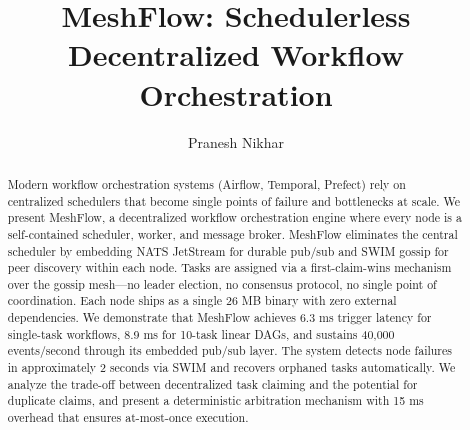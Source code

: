 \documentclass[sigconf]{acmart}
\begin{document}
\title{MeshFlow: Schedulerless Decentralized Workflow Orchestration}

\author{Pranesh Nikhar}

\begin{abstract}
Modern workflow orchestration systems (Airflow, Temporal, Prefect) rely on centralized schedulers that become single points of failure and bottlenecks at scale. We present MeshFlow, a decentralized workflow orchestration engine where every node is a self-contained scheduler, worker, and message broker. MeshFlow eliminates the central scheduler by embedding NATS JetStream for durable pub/sub and SWIM gossip for peer discovery within each node. Tasks are assigned via a first-claim-wins mechanism over the gossip mesh---no leader election, no consensus protocol, no single point of coordination. Each node ships as a single 26 MB binary with zero external dependencies. We demonstrate that MeshFlow achieves 6.3 ms trigger latency for single-task workflows, 8.9 ms for 10-task linear DAGs, and sustains 40,000 events/second through its embedded pub/sub layer. The system detects node failures in approximately 2 seconds via SWIM and recovers orphaned tasks automatically. We analyze the trade-off between decentralized task claiming and the potential for duplicate claims, and present a deterministic arbitration mechanism with 15 ms overhead that ensures at-most-once execution.
\end{abstract}

\maketitle












\end{document}
